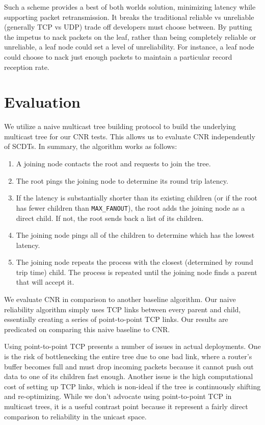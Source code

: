Such a scheme provides a best of both worlds solution, minimizing latency while
supporting packet retransmission.  It breaks the
traditional reliable vs unreliable (generally TCP vs UDP) trade off developers
must choose between.  By putting the impetus to nack packets on the leaf, rather
than being completely reliable or unreliable, a leaf node could set a level of
unreliability.  For instance, a leaf node could choose to nack just enough
packets to maintain a particular record reception rate.


\section{Evaluation}
\label{cnr-eval}
We utilize a naive multicast tree building protocol to build the underlying multicast tree for our CNR tests. This allows us to evaluate CNR independently of SCDTs. In summary, the algorithm works as follows:

\begin{enumerate}  
	\item A joining node contacts the root and requests to join the tree. 
	\item The root pings the joining node to determine its round trip latency. 
	\item If the latency is substantially shorter than its existing children (or if the root has fewer children than \texttt{MAX\_FANOUT}), the root adds the joining node as a direct child. If not, the root sends back a list of its children.
	\item The joining node pings all of the children to determine which has the lowest latency.
	\item The joining node repeats the process with the closest (determined by round trip time) child. The process is repeated until the joining node finds a parent that will accept it.
\end{enumerate}

We evaluate CNR in comparison to another baseline algorithm. Our naive reliability algorithm simply uses TCP links between every parent and child, essentially creating a series of point-to-point TCP links. Our results are predicated on comparing this naive baseline to CNR. 

Using point-to-point TCP presents a number of issues in actual deployments. One is the risk of bottlenecking the entire tree due to one bad link, where a router's buffer becomes full and must drop incoming packets because it cannot push out data to one of its children fast enough. Another issue is the high computational cost of setting up TCP links, which is non-ideal if the tree is continuously shifting and re-optimizing. While we don't advocate using point-to-point TCP in multicast trees, it is a useful contrast point because it represent a fairly direct comparison to reliability in the unicast space.

